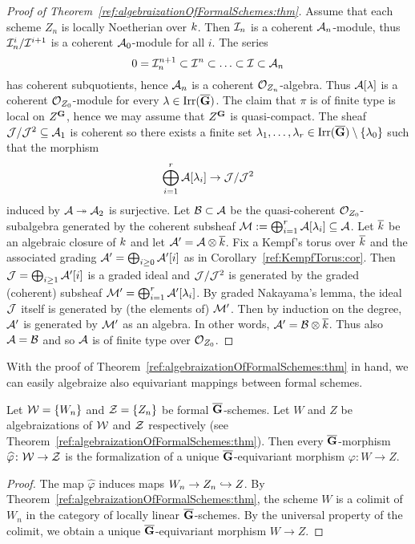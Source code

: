 \begin{proof}[Proof of Theorem~\ref{ref:algebraizationOfFormalSchemes:thm}]
Assume that each scheme $Z_n$ is locally Noetherian over $k$. Then ${\mathcal I}_n$
is a coherent ${\mathcal A}_n$-module, thus ${\mathcal I}_n^i/{\mathcal I}^{i+1}$ is a coherent
${\mathcal A}_0$-module for all $i$. The series
\[
    0 = {\mathcal I}_n^{n+1} \subset {\mathcal I}^n \subset  \ldots \subset {\mathcal I} \subset {\mathcal A}_n
\]
has coherent subquotients, hence ${\mathcal A}_n$ is a coherent ${\mathcal O}_{Z_n}$-algebra.
Thus ${\mathcal A}[\lambda]$ is a coherent ${\mathcal O}_{Z_0}$-module for every
$\lambda\in \operatorname{Irr}(\overline{\mathbf{G}})$. The claim that $\pi$ is of finite type is local on
$Z^{\mathbf{G}}$, hence we may
assume that $Z^{\mathbf{G}}$ is quasi-compact.
The sheaf ${\mathcal J}/{\mathcal J}^2\subseteq {\mathcal A}_1$ is coherent so there exists a finite set
$\lambda_1, \ldots, \lambda_r\in \operatorname{Irr}(\overline{\mathbf{G}})\setminus \{\lambda_0\}$ such that the morphism
\[
    \bigoplus_{i=1}^r{\mathcal A}[\lambda_i]\rightarrow {\mathcal J}/{\mathcal J}^2
\]
induced by ${\mathcal A}\twoheadrightarrow {\mathcal A}_2$ is surjective. Let ${\mathcal B} \subset {\mathcal A}$
be the quasi-coherent ${\mathcal O}_{Z_0}$-subalgebra generated by the coherent
subsheaf ${\mathcal M} := \bigoplus_{i=1}^r{\mathcal A}[\lambda_i]\subseteq {\mathcal A}$.
Let $\overline{k}$ be an algebraic closure of $k$ and let ${\mathcal A}' = {\mathcal A} \otimes
\overline{k}$. Fix a Kempf's torus over
$\overline{k}$ and the associated grading ${\mathcal A}' = \bigoplus_{i\geq 0}
{\mathcal A}'[i]$ as in
Corollary~\ref{ref:KempfTorus:cor}.
Then ${\mathcal J} = \bigoplus_{i\geq 1} {\mathcal A}'[i]$ is a graded ideal and ${\mathcal J}/{\mathcal J}^2$ is
generated by the graded (coherent) subsheaf ${\mathcal M}' = \bigoplus_{i=1}^r{\mathcal A}'[\lambda_i]$. By
graded Nakayama's lemma, the ideal ${\mathcal J}$ itself is generated by (the elements
of) ${\mathcal M}'$. Then by induction on the degree, ${\mathcal A}'$ is generated by ${\mathcal M}'$ as
an algebra. In other words, ${\mathcal A}' = {\mathcal B}\otimes \overline{k}$. Thus also ${\mathcal A} = {\mathcal B}$ and so ${\mathcal A}$ is of
finite type over ${\mathcal O}_{Z_0}$.
\end{proof}

\newcommand{\varphihat}{\widehat{\varphi}}%
With the proof of Theorem~\ref{ref:algebraizationOfFormalSchemes:thm} in hand,
we can easily algebraize also equivariant mappings between formal schemes.

\begin{proposition}\label{ref:algebraizationOfMaps:prop}
    Let ${\mathcal W} = \{W_n\}$ and ${\mathcal Z} = \{Z_n\}$ be formal $\overline{\mathbf{G}}$-schemes. Let $W$ and $Z$ be
    algebraizations of ${\mathcal W}$ and ${\mathcal Z}$ respectively (see
    Theorem~\ref{ref:algebraizationOfFormalSchemes:thm}). Then every
    $\overline{\mathbf{G}}$-morphism $\varphihat\colon\Wformal\to \Zformal$  is the formalization of a unique
    $\overline{\mathbf{G}}$-equivariant morphism $\varphi\colon W\to Z$.
\end{proposition}
\begin{proof}
    The map $\varphihat$ induces maps $W_n \to Z_n \hookrightarrow Z$. By
    Theorem~\ref{ref:algebraizationOfFormalSchemes:thm}, the scheme $W$ is a
    colimit of $W_n$ in the category of locally linear $\overline{\mathbf{G}}$-schemes. By the universal
    property of the colimit, we obtain a unique $\overline{\mathbf{G}}$-equivariant morphism $W\to Z$.
\end{proof}


